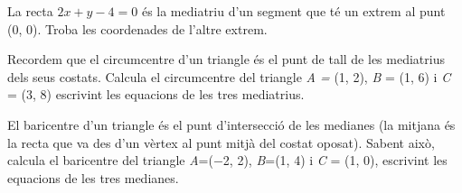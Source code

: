 \begin{activitats}
\begin{mylist}
		
		\exer  La recta $2x+y-4=0$ és la mediatriu d'un segment que té un extrem al punt (0, 0). Troba les coordenades de l'altre extrem.
		
		
	\exer  Recordem que el circumcentre d'un triangle és el punt de tall de les mediatrius dels seus costats. Calcula el circumcentre del triangle \textit{A =} (1, 2), \linebreak \textit{B} = (1, 6) i \textit{C} = (3, 8) escrivint les equacions de les tres mediatrius.
		
	
	
	\exer  El baricentre d'un triangle és el punt d'intersecció de les medianes (la mitjana és la recta que va des d'un vèrtex al punt mitjà del costat oposat). Sabent això, calcula el baricentre del triangle \textit{A}=($-$2, 2), \textit{B}=(1, 4) i \textit{C} = (1, 0), escrivint les equacions de les tres medianes.
		
			

\end{mylist}
\end{activitats}
